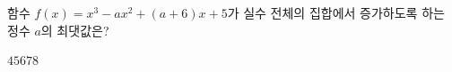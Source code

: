 함수 $f(x)=x^3-ax^2+(a+6)x+5$가 실수 전체의 집합에서 증가하도록 하는 정수 $a$의 최댓값은?
\begin{choices32}{$4$}{$5$}{$6$}{$7$}{$8$}\end{choices32}
